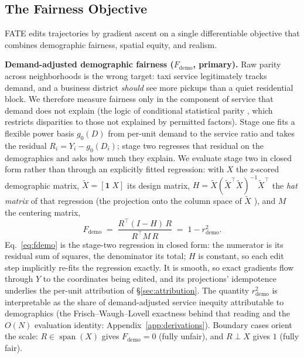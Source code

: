 \subsection{The Fairness Objective}\label{sec:objective}

FATE edits trajectories by gradient ascent on a single differentiable
objective that combines demographic fairness, spatial equity, and realism.

\textbf{Demand-adjusted demographic fairness ($F_{\mathrm{demo}}$, primary).}
Raw parity across neighborhoods is the wrong target: taxi service legitimately
tracks demand, and a business district \emph{should} see more pickups than a
quiet residential block. We therefore measure fairness only in the component of
service that demand does not explain (the logic of conditional statistical
parity \cite{corbettdavies2017}, which restricts disparities to those not
explained by permitted factors). Stage one fits a flexible power basis $g_0(D)$
from per-unit demand to the service ratio and takes the residual
$R_i = Y_i - g_0(D_i)$; stage two regresses that residual on the demographics
and asks how much they explain. We evaluate stage two in closed form rather
than through an explicitly fitted regression: with $X$ the z-scored
demographic matrix, $\tilde{X} = [\mathbf{1}\; X]$ its design matrix,
$H = \tilde{X}(\tilde{X}^{\top}\tilde{X})^{-1}\tilde{X}^{\top}$ the \emph{hat
matrix} of that regression (the projection onto the column space of
$\tilde{X}$ \cite{hoaglinwelsch1978}), and $M$ the centering matrix,
\begin{equation}\label{eq:fdemo}
F_{\mathrm{demo}}
\;=\; \frac{R^{\top}(I-H)\,R}{R^{\top}M\,R}
\;=\; 1 - r^{2}_{\mathrm{demo}} .
\end{equation}
Eq.~\eqref{eq:fdemo} is the stage-two regression in closed form: the
numerator is its residual sum of squares, the denominator its total; $H$ is
constant, so each edit step implicitly re-fits the regression exactly. It is
smooth, so exact gradients flow through $Y$ to the coordinates being edited,
and its projections' idempotence underlies the per-unit attribution of
\S\ref{sec:attribution}. The quantity $r^{2}_{\mathrm{demo}}$ is interpretable
as the share of demand-adjusted service inequity attributable to demographics
(the Frisch--Waugh--Lovell exactness behind that reading and the $O(N)$
evaluation identity: Appendix~\ref{app:derivations}).
Boundary cases orient the scale: $R \in \operatorname{span}(X)$ gives
$F_{\mathrm{demo}} = 0$ (fully unfair), and $R \perp X$ gives $1$ (fully
fair).

